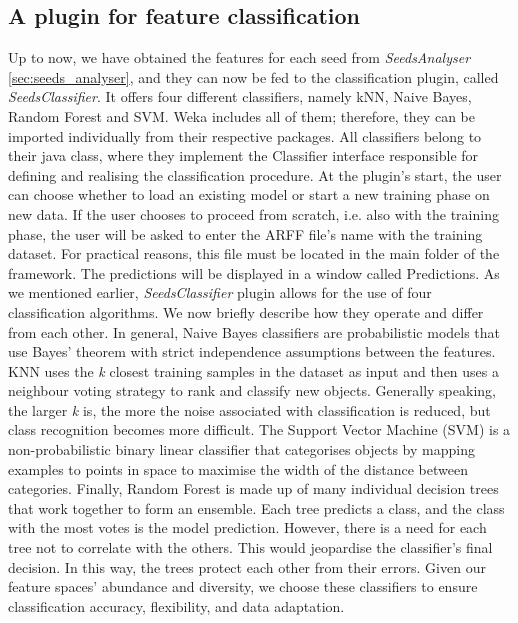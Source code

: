\documentclass[twocolumn]{svjour3}           %
\begin{document}
\subsection{A plugin for feature classification}
\label{sec:feature_classifier}
Up to now, we have obtained the features for each seed from \emph{SeedsAnalyser} \ref{sec:seeds_analyser}, and they can now be fed to the classification plugin, called \emph{SeedsClassifier}.
It offers four different classifiers, namely kNN, Naive Bayes, Random Forest and SVM. Weka \cite{Weka} includes all of them; therefore, they can be imported individually from their respective packages. All classifiers belong to their java class, where they implement the Classifier interface responsible for defining and realising the classification procedure.
At the plugin's start, the user can choose whether to load an existing model or start a new training phase on new data. If the user chooses to proceed from scratch, i.e. also with the training phase, the user will be asked to enter the ARFF file's name with the training dataset. For practical reasons, this file must be located in the main folder of the framework. The predictions will be displayed in a window called Predictions.
As we mentioned earlier, \emph{SeedsClassifier} plugin allows for the use of four classification algorithms. We now briefly describe how they operate and differ from each other.
In general, Naive Bayes classifiers are probabilistic models that use Bayes' theorem with strict independence assumptions between the features. 
%
KNN uses the \textit{k} closest training samples in the dataset as input and then uses a neighbour voting strategy to rank and classify new objects. Generally speaking, the larger \emph{k} is, the more the noise associated with classification is reduced, but class recognition becomes more difficult. 
%
The Support Vector Machine (SVM) is a non-probabilistic binary linear classifier that categorises objects by mapping examples to points in space to maximise the width of the distance between categories.
%
Finally, Random Forest is made up of many individual decision trees that work together to form an ensemble. Each tree predicts a class, and the class with the most votes is the model prediction. However, there is a need for each tree not to correlate with the others. This would jeopardise the classifier's final decision. In this way, the trees protect each other from their errors.
%
Given our feature spaces' abundance and diversity, we choose these classifiers to ensure classification accuracy, flexibility, and data adaptation.
\end{document}

